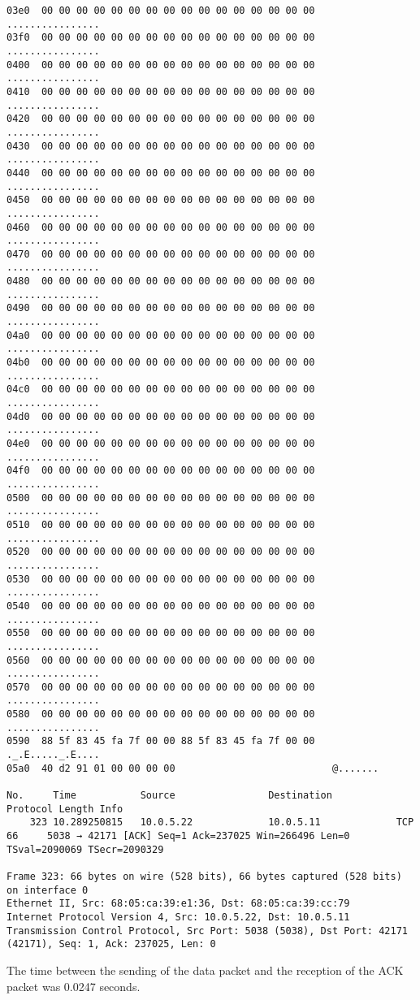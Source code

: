 \begin{lstlisting}
03e0  00 00 00 00 00 00 00 00 00 00 00 00 00 00 00 00   ................
03f0  00 00 00 00 00 00 00 00 00 00 00 00 00 00 00 00   ................
0400  00 00 00 00 00 00 00 00 00 00 00 00 00 00 00 00   ................
0410  00 00 00 00 00 00 00 00 00 00 00 00 00 00 00 00   ................
0420  00 00 00 00 00 00 00 00 00 00 00 00 00 00 00 00   ................
0430  00 00 00 00 00 00 00 00 00 00 00 00 00 00 00 00   ................
0440  00 00 00 00 00 00 00 00 00 00 00 00 00 00 00 00   ................
0450  00 00 00 00 00 00 00 00 00 00 00 00 00 00 00 00   ................
0460  00 00 00 00 00 00 00 00 00 00 00 00 00 00 00 00   ................
0470  00 00 00 00 00 00 00 00 00 00 00 00 00 00 00 00   ................
0480  00 00 00 00 00 00 00 00 00 00 00 00 00 00 00 00   ................
0490  00 00 00 00 00 00 00 00 00 00 00 00 00 00 00 00   ................
04a0  00 00 00 00 00 00 00 00 00 00 00 00 00 00 00 00   ................
04b0  00 00 00 00 00 00 00 00 00 00 00 00 00 00 00 00   ................
04c0  00 00 00 00 00 00 00 00 00 00 00 00 00 00 00 00   ................
04d0  00 00 00 00 00 00 00 00 00 00 00 00 00 00 00 00   ................
04e0  00 00 00 00 00 00 00 00 00 00 00 00 00 00 00 00   ................
04f0  00 00 00 00 00 00 00 00 00 00 00 00 00 00 00 00   ................
0500  00 00 00 00 00 00 00 00 00 00 00 00 00 00 00 00   ................
0510  00 00 00 00 00 00 00 00 00 00 00 00 00 00 00 00   ................
0520  00 00 00 00 00 00 00 00 00 00 00 00 00 00 00 00   ................
0530  00 00 00 00 00 00 00 00 00 00 00 00 00 00 00 00   ................
0540  00 00 00 00 00 00 00 00 00 00 00 00 00 00 00 00   ................
0550  00 00 00 00 00 00 00 00 00 00 00 00 00 00 00 00   ................
0560  00 00 00 00 00 00 00 00 00 00 00 00 00 00 00 00   ................
0570  00 00 00 00 00 00 00 00 00 00 00 00 00 00 00 00   ................
0580  00 00 00 00 00 00 00 00 00 00 00 00 00 00 00 00   ................
0590  88 5f 83 45 fa 7f 00 00 88 5f 83 45 fa 7f 00 00   ._.E....._.E....
05a0  40 d2 91 01 00 00 00 00                           @.......

No.     Time           Source                Destination           Protocol Length Info
    323 10.289250815   10.0.5.22             10.0.5.11             TCP      66     5038 → 42171 [ACK] Seq=1 Ack=237025 Win=266496 Len=0 TSval=2090069 TSecr=2090329

Frame 323: 66 bytes on wire (528 bits), 66 bytes captured (528 bits) on interface 0
Ethernet II, Src: 68:05:ca:39:e1:36, Dst: 68:05:ca:39:cc:79
Internet Protocol Version 4, Src: 10.0.5.22, Dst: 10.0.5.11
Transmission Control Protocol, Src Port: 5038 (5038), Dst Port: 42171 (42171), Seq: 1, Ack: 237025, Len: 0

\end{lstlisting}

The time between the sending of the data packet and the reception of the ACK packet was 0.0247 seconds.
